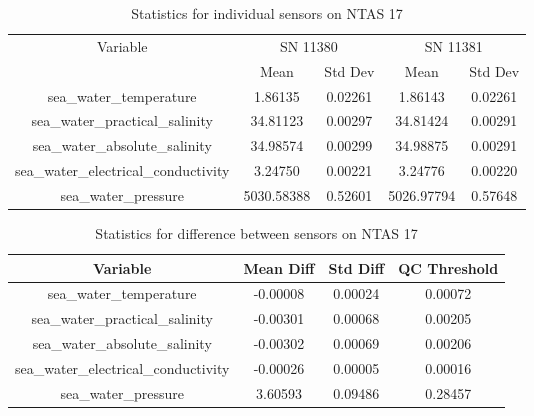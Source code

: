 \begin{table}[h]
\centering
\begin{tabular}{|c|c|c|c|c|}
\hline
Variable & \multicolumn{2}{c|}{SN 11380} & \multicolumn{2}{c|}{SN 11381} \\
& Mean & Std Dev & Mean & Std Dev \\
\hline
sea\_water\_temperature & 1.86135 & 0.02261 & 1.86143 & 0.02261 \\
sea\_water\_practical\_salinity & 34.81123 & 0.00297 & 34.81424 & 0.00291 \\
sea\_water\_absolute\_salinity & 34.98574 & 0.00299 & 34.98875 & 0.00291 \\
sea\_water\_electrical\_conductivity & 3.24750 & 0.00221 & 3.24776 & 0.00220 \\
sea\_water\_pressure & 5030.58388 & 0.52601 & 5026.97794 & 0.57648 \\
\hline
\end{tabular}
\caption{Statistics for individual sensors on NTAS 17}
\end{table}

\begin{table}[h]
\centering
\begin{tabular}{|c|c|c|c|}
\hline
Variable & Mean Diff & Std Diff & QC Threshold \\
\hline
sea\_water\_temperature & -0.00008 & 0.00024 & 0.00072 \\
sea\_water\_practical\_salinity & -0.00301 & 0.00068 & 0.00205 \\
sea\_water\_absolute\_salinity & -0.00302 & 0.00069 & 0.00206 \\
sea\_water\_electrical\_conductivity & -0.00026 & 0.00005 & 0.00016 \\
sea\_water\_pressure & 3.60593 & 0.09486 & 0.28457 \\
\hline
\end{tabular}
\caption{Statistics for difference between sensors on NTAS 17}
\end{table}

